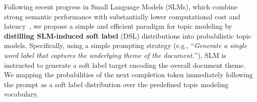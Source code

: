 \documentclass{article}
\theoremstyle{plain}
\theoremstyle{definition}
\theoremstyle{remark}
\begin{document}
Following recent progress in Small Language Models (SLMs), which combine strong semantic performance with substantially lower computational cost and latency~\citep{wang2025survey, belcak2025small}, we propose a simple and efficient paradigm for topic modeling by \textbf{distilling SLM-induced soft label} (DSL) distributions into probabilistic topic models.
Specifically, using a simple prompting strategy (e.g., ``\textit{Generate a single word label that captures the underlying theme of the document.}''), SLM is instructed to generate a soft label target encoding the overall document theme. 
We mapping the probabilities of the next completion token immediately following the prompt as a soft label distribution over the predefined topic modeling vocabulary. 
\end{document}
